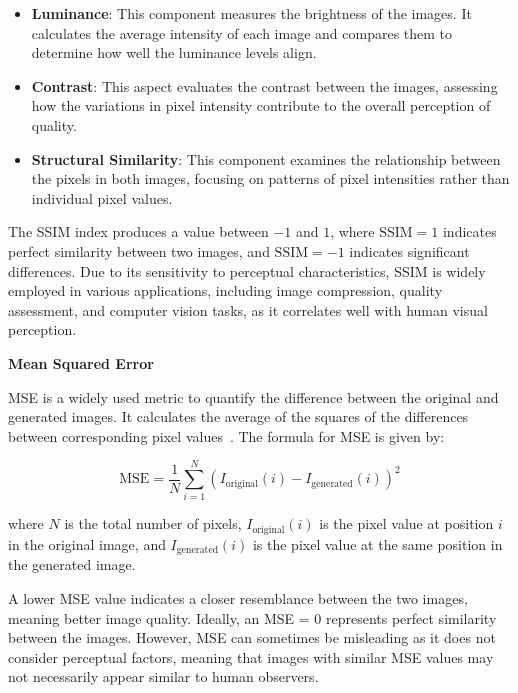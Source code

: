 \documentclass[12pt,DIV14,BCOR12mm,a4paper,footinclude=false,headinclude,parskip=half-,twoside,openright,cleardoublepage=empty,toc=index,bibliography=totoc,listof=totoc]{scrreprt}
\numberwithin{equation}{chapter}
\begin{document}
\begin{itemize}
    \item \textbf{Luminance}: This component measures the brightness of the images. It calculates the average intensity of each image and compares them to determine how well the luminance levels align.
    
    \item \textbf{Contrast}: This aspect evaluates the contrast between the images, assessing how the variations in pixel intensity contribute to the overall perception of quality.
    
    \item \textbf{Structural Similarity}: This component examines the relationship between the pixels in both images, focusing on patterns of pixel intensities rather than individual pixel values.
\end{itemize}

The SSIM index produces a value between $-1$ and $1$, where $\text{SSIM} = 1$ indicates perfect similarity between two images, and $\text{SSIM} = -1$ indicates significant differences. Due to its sensitivity to perceptual characteristics, SSIM is widely employed in various applications, including image compression, quality assessment, and computer vision tasks, as it correlates well with human visual perception.

\textbf{Mean Squared Error}

MSE is a widely used metric to quantify the difference between the original and generated images. It calculates the average of the squares of the differences between corresponding pixel values~\cite{sara2019image}. The formula for MSE is given by:

\begin{equation}
\text{MSE} = \frac{1}{N} \sum_{i=1}^{N} \left(I_{\text{original}}(i) - I_{\text{generated}}(i)\right)^2
\end{equation}

where \( N \) is the total number of pixels, \( I_{\text{original}}(i) \) is the pixel value at position \( i \) in the original image, and \( I_{\text{generated}}(i) \) is the pixel value at the same position in the generated image.

A lower MSE value indicates a closer resemblance between the two images, meaning better image quality. Ideally, an MSE = 0 represents perfect similarity between the images. However, MSE can sometimes be misleading as it does not consider perceptual factors, meaning that images with similar MSE values may not necessarily appear similar to human observers.
\end{document}
